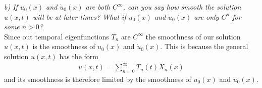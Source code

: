 \documentclass[12pt]{article}
\theoremstyle{remark}
\begin{document}
\textit{b) If $u_0(x)$ and $\dot{u}_0(x)$ are both $C^\infty$, can you say how smooth the solution $u(x,t)$ will be at later times? What if $u_0(x)$ and $\dot{u}_0(x)$ are only $C^n$ for some $n > 0$?} \\

Since out temporal eigenfunctions $T_n$ are $C^\infty$ the smoothness of our solution $u(x,t)$ is the smoothness of $u_0(x)$ and $\dot{u}_0(x)$. This is because the general solution $u(x,t)$ has the form
\begin{align*}
	u(x,t) = \sum\limits_{n=0}^\infty T_n(t)X_n(x)
\end{align*} 
and its smoothness is therefore limited by the smoothness of $u_0(x)$ and $\dot{u}_0(x)$.
\end{document}
